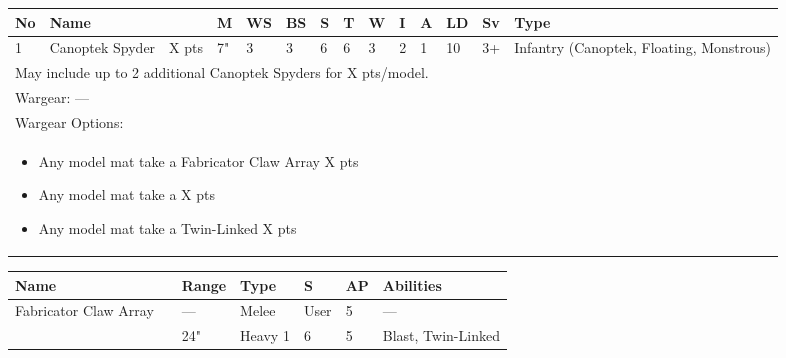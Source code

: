 \noindent
\begin{tabular}{||m{10pt} m{95pt} m{30pt} m{11pt} m{11pt} m{11pt} m{11pt} m{11pt} m{11pt} m{11pt} m{11pt} m{11pt} m{11pt} m{125pt}||}
	\hline
	No & Name & & M & WS & BS & S & T & W & I & A & LD & Sv & Type \\
	\hline
	1 & Canoptek Spyder & X pts & 7" & 3 & 3 & 6 & 6 & 3 & 2 & 1 & 10 & 3+ & Infantry (Canoptek, Floating, Monstrous)\\
	\hline
	\hline
	\multicolumn{14}{||Z{532 pt}||}{May include up to 2 additional Canoptek Spyders for X pts/model.}\\		
	\hline
	\hline
	\multicolumn{14}{||Z{532 pt}||}{Wargear: —}\\
	\multicolumn{14}{||Z{532 pt}||}{Wargear Options:} \\	\multicolumn{14}{||Z{532 pt}||}{\begin{itemize}
			\item Any model mat take a Fabricator Claw Array \hrulefill X pts
			\item Any model mat take a \quickref{Gloom Prism} \hrulefill X pts
			\item Any model mat take a Twin-Linked \quickref{Particle Beamer} \hrulefill X pts
	\end{itemize}} \\
	\hline
\end{tabular}

\noindent
\begin{tabular}{||m{110pt} m{30pt} m{31pt} m{55pt} m{12pt} m{12pt} m{210pt}||}
	\hline
	Name & & Range & Type & S & AP & Abilities \\
	\hline
	Fabricator Claw Array & & — & Melee & User & 5 & — \\
	\quickref{Particle Beamer} & & 24" & Heavy 1 & 6 & 5 & Blast, Twin-Linked \\
	\hline
\end{tabular}

